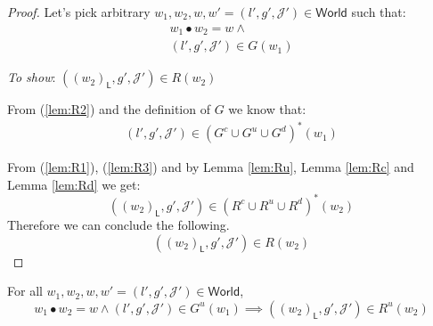 {\parindent0pt
\begin{proof}
Let's pick arbitrary $w_1, w_2, w, w' = (l', g', \mathcal{J}') \in \mathsf{World}$ such that:
\begin{gather}
	\label{lem:R1} w_1 \bullet w_2 = w \land
	\\
	\label{lem:R2} (l', g', \mathcal{J}') \in G(w_1)
\end{gather}

\textit{To show}: $((w_2)_\mathsf{L}, g', \mathcal{J}') \in R(w_2)$

From (\ref{lem:R2}) and the definition of $G$ we know that:
\begin{gather}
	\label{lem:R3} (l', g', \mathcal{J}') \in (G^c \cup G^u \cup G^d)^*(w_1)
\end{gather}

From (\ref{lem:R1}), (\ref{lem:R3}) and by Lemma \ref{lem:Ru}, Lemma \ref{lem:Rc} and Lemma \ref{lem:Rd} we get:
\[
	((w_2)_\mathsf{L}, g', \mathcal{J}') \in (R^c \cup R^u \cup R^d)^*(w_2)
\]
Therefore we can conclude the following.
\[
	((w_2)_\mathsf{L}, g', \mathcal{J}') \in R(w_2)
\]
\end{proof}
}

\lem \label{lem:Ru} For all $w_1, w_2, w, w' = (l', g', \mathcal{J}') \in \mathsf{World}$,
\[
	w_1 \bullet w_2 = w \land (l', g', \mathcal{J}') \in G^u(w_1) \implies ((w_2)_\mathsf{L}, g', \mathcal{J}') \in R^u(w_2)
\]

